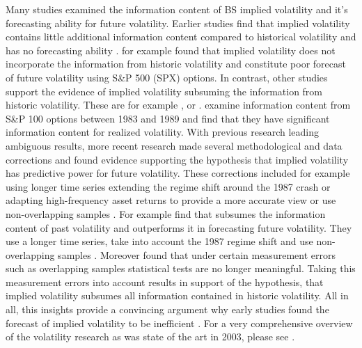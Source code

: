 Many studies examined the information content of \gls{BS} implied volatility and it's forecasting ability for future volatility. Earlier studies find that implied volatility contains little additional information content compared to historical volatility and has no forecasting ability \parencite{jiang2003}. \textcite{canina1993} for example found that implied volatility does not incorporate the information from historic volatility and constitute poor forecast of future volatility using S\&P 500 (\gls{SPX}) options. In contrast, other studies  support the evidence of implied volatility subsuming the information from historic volatility. These are for example \textcite{day1992}, \textcite{lamoureux1993} or \textcite{jorion1995}. \textcite{day1992} examine information content from S\&P 100 options between 1983 and 1989 and find that they have significant information content for realized volatility. With previous research leading ambiguous results, more recent research made several methodological and data corrections and found evidence supporting the hypothesis that implied volatility has predictive power for future volatility. These corrections included for example using longer time series extending the regime shift around the 1987 crash or adapting high-frequency asset returns to provide a more accurate view or use non-overlapping samples \parencite{jiang2003}. For example \textcite{christensen1998} find that subsumes the information content of past volatility and outperforms it in forecasting future volatility. They use a longer time series, take into account the 1987 regime shift and use non-overlapping samples \parencite{jiang2003}. Moreover \textcite{christensen2001} found that under certain measurement errors such as overlapping samples statistical tests are no longer meaningful. Taking this measurement errors into account results in support of the hypothesis, that implied volatility subsumes all information contained in historic volatility. All in all, this insights provide a convincing argument why early studies found the forecast of implied volatility to be inefficient \parencite{jiang2003}. For a very comprehensive overview of the volatility research as was state of the art in 2003, please see \textcite{poon}. \\
%
